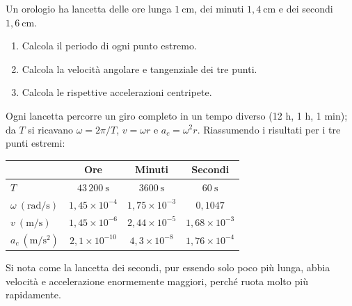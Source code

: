\begin{question}[ID=1.5, subtitle={Orologio — velocità e accelerazione centripeta delle tre lancette}, tags={moto circolare}, difficulty=media]
Un orologio ha lancetta delle ore lunga $1\ \mathrm{cm}$, dei minuti $1{,}4\ \mathrm{cm}$ e dei secondi $1{,}6\ \mathrm{cm}$.
\begin{enumerate}
\item Calcola il periodo di ogni punto estremo.
\item Calcola la velocità angolare e tangenziale dei tre punti.
\item Calcola le rispettive accelerazioni centripete.
\end{enumerate}
\begin{solution}
Ogni lancetta percorre un giro completo in un tempo diverso (12 h, 1 h, 1 min); da $T$ si ricavano $\omega = 2\pi/T$, $v = \omega r$ e $a_c = \omega^2 r$. Riassumendo i risultati per i tre punti estremi:
\begin{tabular}{lccc}
 & Ore & Minuti & Secondi \\
\hline
$T$ & $43\,200\ \mathrm{s}$ & $3600\ \mathrm{s}$ & $60\ \mathrm{s}$ \\
$\omega\ (\mathrm{rad/s})$ & $1{,}45\times10^{-4}$ & $1{,}75\times10^{-3}$ & $0{,}1047$ \\
$v\ (\mathrm{m/s})$ & $1{,}45\times10^{-6}$ & $2{,}44\times10^{-5}$ & $1{,}68\times10^{-3}$ \\
$a_c\ (\mathrm{m/s^2})$ & $2{,}1\times10^{-10}$ & $4{,}3\times10^{-8}$ & $1{,}76\times10^{-4}$ \\
\end{tabular}

Si nota come la lancetta dei secondi, pur essendo solo poco più lunga, abbia velocità e accelerazione enormemente maggiori, perché ruota molto più rapidamente.
\end{solution}
\end{question}


